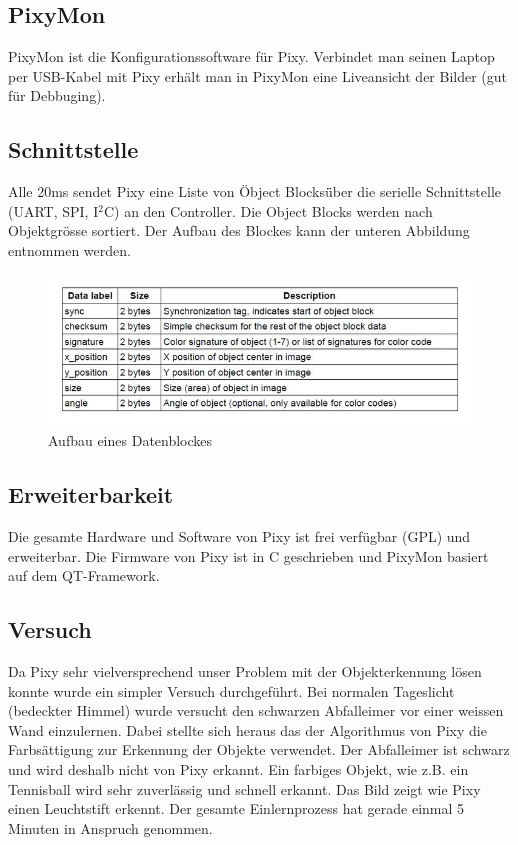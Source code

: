 \subsection{PixyMon}

PixyMon ist die Konfigurationssoftware für Pixy. Verbindet man seinen Laptop per USB-Kabel mit Pixy erhält man in PixyMon eine Liveansicht der Bilder (gut für Debbuging).

\subsection{Schnittstelle}

Alle 20ms sendet Pixy eine Liste von \"Object Blocks\" über die serielle Schnittstelle (UART, SPI, I$^2$C) an den Controller. Die Object Blocks werden nach Objektgrösse sortiert. Der Aufbau des Blockes kann der unteren Abbildung entnommen werden.

\begin{figure}[h!]
\centering
\includegraphics[width=0.7\linewidth]{../../fig/pixy_schnittstelle}
\caption{Aufbau eines Datenblockes}
\label{fig:pixy_schnittstelle}
\end{figure}

\subsection{Erweiterbarkeit}

Die gesamte Hardware und Software von Pixy ist frei verfügbar (GPL) und erweiterbar. Die Firmware von Pixy ist in C geschrieben und PixyMon basiert auf dem QT-Framework.

\subsection{Versuch}

Da Pixy sehr vielversprechend unser Problem mit der Objekterkennung lösen konnte wurde ein simpler Versuch durchgeführt. Bei normalen Tageslicht (bedeckter Himmel) wurde versucht den schwarzen Abfalleimer vor einer weissen Wand einzulernen. Dabei stellte sich heraus das der Algorithmus von Pixy die Farbsättigung zur Erkennung der Objekte verwendet. Der Abfalleimer ist schwarz und wird deshalb nicht von Pixy erkannt. Ein farbiges Objekt, wie z.B. ein Tennisball wird sehr zuverlässig und schnell erkannt. Das Bild zeigt wie Pixy einen Leuchtstift erkennt. Der gesamte Einlernprozess hat gerade einmal 5 Minuten in Anspruch genommen.

